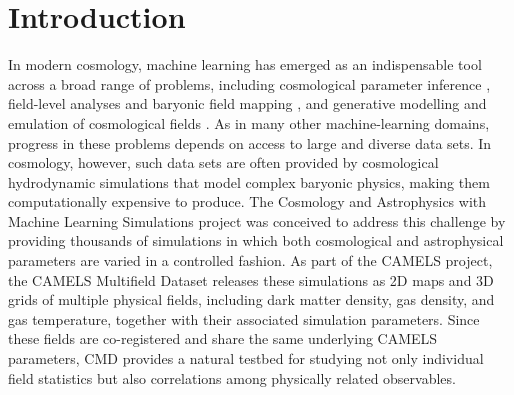 \documentclass{article}
\begin{document}

\section{Introduction}
\label{sec:intro}
In modern cosmology, machine learning has emerged as an indispensable
tool across a broad range of problems,
including cosmological parameter inference
\citep{Ravanbakhsh2017,Cranmer2020}, field-level analyses and baryonic
field mapping \citep{JoKim2019,Zhang2019}, and generative modelling
and emulation of cosmological fields
\citep{Mustafa2019,He2019,Perraudin2021}.
As in many other machine-learning domains, progress in these problems
depends on access to large and diverse data sets. In cosmology, however,
such data sets are often provided by cosmological hydrodynamic
simulations that model complex baryonic physics, making them
computationally expensive to produce.
The Cosmology and Astrophysics with Machine Learning Simulations
\citep[CAMELS;][]{Villaescusa2021} project was conceived to address
this challenge by providing thousands of simulations in which both
cosmological and astrophysical parameters are varied in a controlled
fashion. As part of the CAMELS project, the CAMELS Multifield Dataset \citep[CMD;][]{Villaescusa2022}
releases these simulations as 2D maps and 3D grids of multiple
physical fields, including dark matter density, gas density, and gas temperature, 
together with their associated simulation parameters.
Since these fields are co-registered and share the same underlying
CAMELS parameters, CMD provides a natural testbed for studying not
only individual field statistics but also correlations among
physically related observables.
\end{document}

